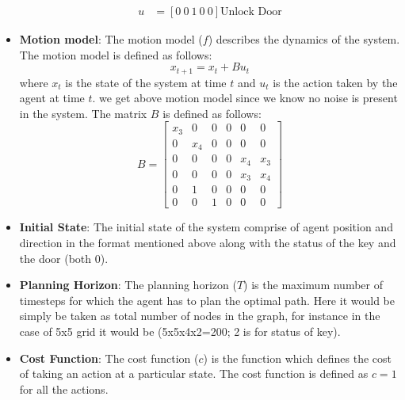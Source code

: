 \documentclass[conference]{IEEEtran}
\begin{document}
\begin{itemize}
\begin{align*}
u &=[0 \ 0 \ 1 \ 0 \ 0] \text{Unlock Door}
\end{align*}
\item \textbf{Motion model}: The motion model ($f$) describes the dynamics of the system. The motion model is defined as follows:
\begin{equation*}
    x_{t+1} = x_{t} + Bu_t
\end{equation*}
where $x_t$ is the state of the system at time $t$ and $u_t$ is the action taken by the agent at time $t$. we get above motion model since we know no noise is present in the system. The matrix $B$ is defined as follows:
\begin{equation*}
    B = \begin{bmatrix}
    x_3 & 0 & 0 & 0 & 0 & 0\\
    0 & x_4 & 0 & 0 & 0 & 0\\
    0 & 0 & 0 & 0 & x_4 & x_3\\
    0 & 0 & 0 & 0 & x_3 & x_4\\
    0 & 1 & 0 & 0 & 0 & 0\\
    0 & 0 & 1 & 0 & 0 & 0
    \end{bmatrix}
\end{equation*}
\item \textbf{Initial State}: The initial state of the system comprise of agent position and direction in the format mentioned above along with the status of the key and the door (both 0).
\item \textbf{Planning Horizon}: The planning horizon ($T$) is the maximum number of timesteps for which the agent has to plan the optimal path. Here it would be simply be taken as total number of nodes in the graph, for instance in the case of 5x5 grid it would be (5x5x4x2=200; 2 is for status of key).
\item \textbf{Cost Function}: The cost function ($c$) is the function which defines the cost of taking an action at a particular state. The cost function is defined as $c=1$ for all the actions.
\end{itemize}
\end{document}
